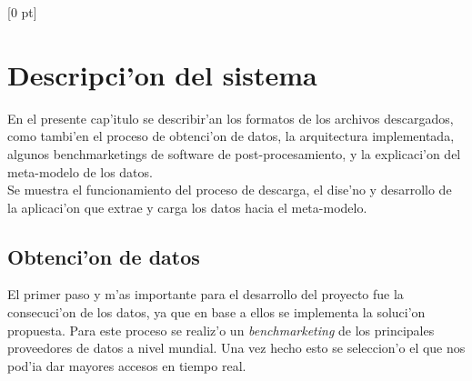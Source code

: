 \titlespacing{\chapter}{0 pt}{30 pt}{50 pt}[0 pt]
\titleformat{\section}{\Large\bfseries}{\thesection}{0 pt}{\hspace{30 pt}}
\titleformat{\subsection}{\large\bfseries}{\thesubsection}{0 pt}{\hspace{30 pt}}
\pagestyle{fancy}
\fancyhead[LO,LE]{\footnotesize\emph{\leftmark}}
\fancyhead[RO,RE]{\thepage}
\fancyfoot[CO,CE]{}
\newcommand{\tabitem}{~~\llap{\textbullet}~~}

\chapter{Descripci'on del sistema} %

\normalsize
\noindent
En el presente cap'itulo se describir'an los formatos de los archivos descargados, como tambi'en el proceso de obtenci'on de datos, la arquitectura implementada, algunos benchmarketings de software de post-procesamiento, y la explicaci'on del meta-modelo de los datos.\\

Se muestra el funcionamiento del proceso de descarga, el dise'no y desarrollo de la aplicaci'on que extrae y carga los datos hacia el meta-modelo.

\section{Obtenci'on de datos}
\noindent
El primer paso y m'as importante para el desarrollo del proyecto fue la consecuci'on de los datos, ya que en base a ellos se implementa la soluci'on propuesta. Para este proceso se realiz'o un \emph{benchmarketing} de los principales proveedores de datos a nivel mundial. Una vez hecho esto se seleccion'o el que nos pod'ia dar mayores accesos en tiempo real.\\

